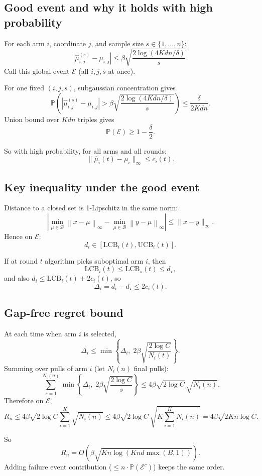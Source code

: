 \documentclass[11pt]{article}
\newcommand{\distB}[1]{\min_{\mu \in \mathcal{B}} \left\| #1 - \mu \right\|_{\infty}}
\begin{document}
\subsection*{Good event and why it holds with high probability}

For each arm $i$, coordinate $j$, and sample size $s \in \{1,\dots,n\}$:
\[
\left| \hat{\mu}_{i,j}^{(s)} - \mu_{i,j} \right|
\le
\beta\sqrt{\frac{2\log(4Kdn/\delta)}{s}}.
\]
Call this global event $\mathcal{E}$ (all $i,j,s$ at once).

For one fixed $(i,j,s)$, subgaussian concentration gives
\[
\mathbb{P}\!\left(
\left| \hat{\mu}_{i,j}^{(s)} - \mu_{i,j} \right|
>
\beta\sqrt{\frac{2\log(4Kdn/\delta)}{s}}
\right)
\le
\frac{\delta}{2Kdn}.
\]
Union bound over $Kdn$ triples gives
\[
\mathbb{P}(\mathcal{E}) \ge 1-\frac{\delta}{2}.
\]

So with high probability, for all arms and all rounds:
\[
\|\hat{\mu}_i(t)-\mu_i\|_\infty \le c_i(t).
\]

\subsection*{Key inequality under the good event}

Distance to a closed set is 1-Lipschitz in the same norm:
\[
|\distB{x}-\distB{y}| \le \|x-y\|_\infty.
\]
Hence on $\mathcal{E}$:
\[
d_i \in [\mathrm{LCB}_i(t),\mathrm{UCB}_i(t)].
\]

If at round $t$ algorithm picks suboptimal arm $i$, then
\[
\mathrm{LCB}_i(t)\le \mathrm{LCB}_\star(t)
\le d_\star,
\]
and also $d_i\le \mathrm{LCB}_i(t)+2c_i(t)$, so
\[
\Delta_i = d_i-d_\star \le 2c_i(t).
\]

\subsection*{Gap-free regret bound}

At each time when arm $i$ is selected,
\[
\Delta_i \le \min\!\left\{\Delta_i,\;2\beta\sqrt{\frac{2\log C}{N_i(t)}}\right\}.
\]
Summing over pulls of arm $i$ (let $N_i(n)$ final pulls):
\[
\sum_{s=1}^{N_i(n)} \min\!\left\{\Delta_i,\;2\beta\sqrt{\frac{2\log C}{s}}\right\}
\le
4\beta\sqrt{2\log C}\,\sqrt{N_i(n)}.
\]
Therefore on $\mathcal{E}$,
\[
R_n
\le
4\beta\sqrt{2\log C}\sum_{i=1}^K \sqrt{N_i(n)}
\le
4\beta\sqrt{2\log C}\,\sqrt{K\sum_{i=1}^K N_i(n)}
=
4\beta\sqrt{2Kn\log C}.
\]

So
\[
R_n = O\!\left(\beta\sqrt{Kn\log(Knd\max(B,1))}\right).
\]
Adding failure event contribution ($\le n\cdot \mathbb{P}(\mathcal{E}^c)$) keeps the same order.
\end{document}
